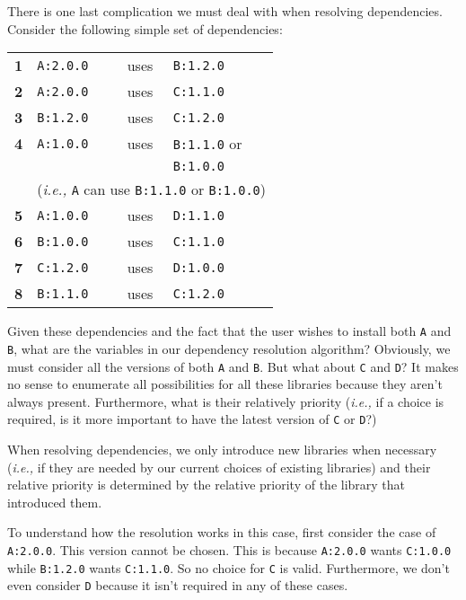 \documentclass[11pt,a4paper,twocolumn]{article}
\renewcommand{\small}{\fontsize{9.5pt}{11.1pt}\selectfont}
\newcommand{\code}[1]{\texttt{#1}} %
\begin{document}
There is one last complication we must deal with when resolving
dependencies.  Consider the following simple set of dependencies:
{\small
\begin{center}
\begin{tabular}{llcl}
  \textbf{1} &\code{A:2.0.0} &uses &\code{B:1.2.0}\\
  \textbf{2} &\code{A:2.0.0} &uses &\code{C:1.1.0}\\
  \textbf{3} &\code{B:1.2.0} &uses &\code{C:1.2.0}\\
  \textbf{4} &\code{A:1.0.0} &uses &\code{B:1.1.0} or\\
             &               &     &\code{B:1.0.0} \\
             & \multicolumn{3}{c}{(\emph{i.e.,} \code{A} can use \code{B:1.1.0} or \code{B:1.0.0})}\\
  \textbf{5} &\code{A:1.0.0} &uses &\code{D:1.1.0}\\
  \textbf{6} &\code{B:1.0.0} &uses &\code{C:1.1.0}\\
  \textbf{7} &\code{C:1.2.0} &uses &\code{D:1.0.0}\\
  \textbf{8} &\code{B:1.1.0} &uses &\code{C:1.2.0}
\end{tabular}
\end{center}
}
Given these dependencies and the fact that the user wishes to install
both \code{A} and \code{B}, what are the variables in our dependency
resolution algorithm?  Obviously, we must consider all the versions of
both \code{A} and \code{B}.  But what about \code{C} and \code{D}?
It makes no sense to enumerate all possibilities for all these
libraries because they aren't always present.  Furthermore, what is
their relatively priority (\emph{i.e.,} if a choice is required, is it
more important to have the latest version of \code{C} or \code{D}?)

When resolving dependencies, we only introduce new libraries when
necessary (\emph{i.e.,} if they are needed by our current choices of
existing libraries) and their relative priority is determined by the
relative priority of the library that introduced them.

To understand how the resolution works in this case, first consider
the case of \code{A:2.0.0}.  This version cannot be chosen.  This is
because \code{A:2.0.0} wants \code{C:1.0.0} while \code{B:1.2.0}
wants \code{C:1.1.0}.  So no choice for \code{C} is valid.
Furthermore, we don't even consider \code{D} because it isn't
required in any of these cases.
\end{document}
